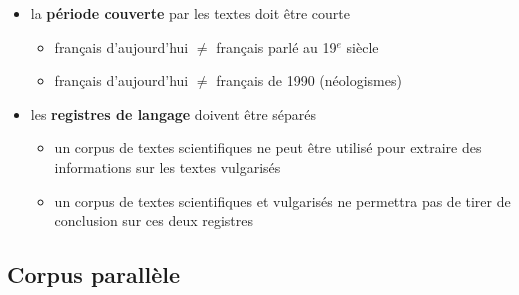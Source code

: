 \begin{frame}[allowframebreaks]
\begin{itemize} \itemsep0.8em
    \item la \textbf{période couverte} par les textes doit être courte
    \begin{itemize}
        \item français d'aujourd'hui $\ne$ français parlé au 19$^e$ siècle
        \item français d'aujourd'hui $\ne$ français de 1990 (néologismes)
    \end{itemize}
    \item les \textbf{registres de langage} doivent être séparés
    \begin{itemize}
        \item un corpus de textes scientifiques ne peut être utilisé pour 
              extraire des informations sur les textes vulgarisés
        \item un corpus de textes scientifiques et vulgarisés ne permettra pas 
              de tirer de conclusion sur ces deux registres
    \end{itemize}
\end{itemize}

\end{frame}



\subsection{Corpus parallèle}


